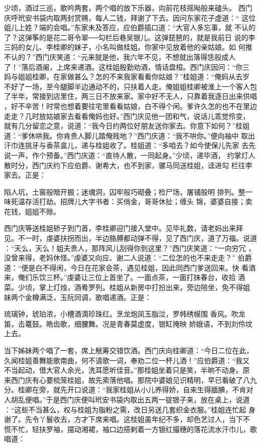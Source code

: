 少顷，酒过三巡，歌吟两套，两个唱的放下乐器，向前花枝摇飐般来磕头。
西门庆呼玳安书袋内取两封赏赐，每人二钱，拜谢了下去。因问东家花子虚道：“
这位姐儿上姓？端的会唱。”东家未及答应，应伯爵插口道：“大官人多忘事，就
不认的了？这弹筝的是花二哥令翠──勾栏后巷吴银儿。这弹琵琶的，就是我前日
说的李三妈的女儿、李桂卿的妹子，小名叫做桂姐。你家中见放着他的亲姑娘。如
何推不认的？”西门庆笑道：“元来就是他，我六年不见，不想就出落得恁般成人
了！”落后酒阑，上席来递酒。这桂姐殷勤劝酒，情话盘桓。西门庆因问：“你三
妈与姐姐桂卿，在家做甚么？怎的不来我家看看你姑娘？”桂姐道：“俺妈从去岁
不好了一场，至今腿脚半边通动不的，只扶着人走。俺姐姐桂卿被淮上一个客人包
了半年，常接到店里住，两三日不放来家。家中好不无人，只靠着我逐日出来供唱
，好不辛苦！时常也想着要往宅里看看姑娘，白不得个闲。爹许久怎的也不在里边
走走？几时放姑娘家去看看俺妈也好。”西门庆见他一团和气，说话儿乖觉伶变，
就有几分留恋之意，说道：“我今日约两位好朋友送你家去。你意下如何？”桂姐
道：“爹休哄我。你肯贵人脚儿踏俺贱地？”西门庆道：“我不哄你。”便向袖中
取出汗巾连挑牙与香茶盒儿，递与桂姐收了。桂姐道：“多咱去？如今使保儿先家
去先说一声，作个预备。”西门庆道：“直待人散，一同起身。”少顷，递毕酒，
约掌灯人散时分，西门庆约下应伯爵、谢希大，也不到家，骡马同送桂姐，迳进勾
栏往李家去。正是：

陷人坑，土窖般暗开掘；迷魂洞，囚牢般巧砌叠；检尸场，屠铺般明
排列。整一味死温存活打劫。招牌儿大字书者：买俏金，哥哥休扯；缠头
锦，婆婆自接；卖花钱，姐姐不赊。

西门庆等送桂姐轿子到门首，李桂卿迎门接入堂中。见毕礼数，请老妈出来拜
见。不一时，虔婆扶拐而出，半边胳膊都动弹不得，见了西门庆，道了万福。说道
：“天么，天么！姐夫贵人，那阵风儿刮得你到这里？”西门庆笑道：“一向穷冗
，没曾来得，老妈休怪。”虔婆又向应、谢二人说道：“二位怎的也不来走走？”
伯爵道：“便是白不得闲，今日在花家会茶，遇见桂姐，因此同西门爹送回来。快
看酒来，俺们乐饮三杯。”虔婆让三位上首坐了。一面点茶，一面打抹春台，收拾
酒菜。少顷，掌上灯烛，酒肴罗列。桂姐从新房中打扮出来，旁边陪坐，免不得姐
妹两个金樽满泛，玉阮同调，歌唱递酒。正是：

琉璃钟，琥珀浓，小槽酒滴珍珠红。烹龙炮凤玉脂泣，罗帏绣幙围
香风。吹龙笛，击鼍鼓。皓齿歌，细腰舞。况是青春莫虚度，银缸掩映
娇娥语，不到刘伶坟上去。

当下姊妹两个唱了一套，席上觥筹交错饮酒。西门庆向桂卿道：“今日二位在此，
久闻桂姐善舞能歌南曲，何不请歌一词，奉劝二位一杯儿酒！”应伯爵道：“我又
不当起动，借大官人余光，洗耳愿听佳音。”那桂姐坐着只是笑，半晌不动身。原
来西门庆有心要梳笼桂姐，故先索落他唱。那院中婆娘见识精明，早已看破了八九
分。桂卿在旁，就先开口说道：“我家桂姐从小儿养得娇，自来生得腼腆，不肯对
人胡乱便唱。”于是西门庆便叫玳安书袋内取出五两一锭银子来，放在桌上，说道
：“这些不当甚么，权与桂姐为脂粉之需，改日另送几套织金衣服。”桂姐连忙起
身谢了。先令丫鬟收去，方才下席来唱。这桂姐虽年纪不多，却色艺过人，当下不
慌不忙，轻扶罗袖，摆动湘裙，袖口边搭剌着一方银红撮穗的落花流水汗巾儿，歌
唱道：

